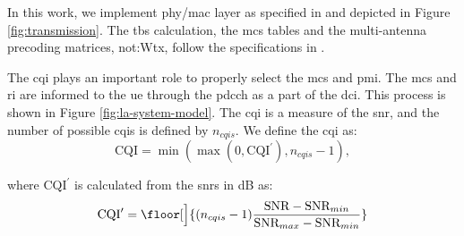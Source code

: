 
%
In this work, we implement \gls{phy}/\gls{mac} layer as specified in \cite{3gpp.38.212} and depicted in Figure \ref{fig:transmission}.
%
%
The \gls{tbs} calculation, the \gls{mcs} tables and the multi-antenna precoding matrices, \gls{not:Wtx}, follow the specifications in \cite{3gpp.38.214}.
%


The \gls{cqi} plays an important role to properly select the \gls{mcs} and \gls{pmi}.
%
The \gls{mcs} and \gls{ri} are informed to the \gls{ue} through the \gls{pdcch} as a part of the \gls{dci}. This process is shown in Figure \ref{fig:la-system-model}.
%
The \gls{cqi} is a measure of the \gls{snr}, and the number of possible \gls{cqi}s is defined by $n_{cqis}$. We define the \gls{cqi} as:
\begin{equation}\label{eq:cqi}
\textrm{CQI} = \min{
	(\max {(0, \textrm{CQI}^{\prime} ) }, n_{cqis} - 1)},
\end{equation}

\noindent where $\textrm{CQI}^{\prime}$ is calculated from the \gls{snr}s in dB as:
\begin{equation}\label{eq:cqi_prime}
\textrm{CQI}^{\prime} = \floor[\Big]{(n_{cqis}-1)\frac{\textrm{SNR} - \textrm{SNR}_{min}}{\textrm{SNR}_{max}-\textrm{SNR}_{min}}}
\end{equation}


